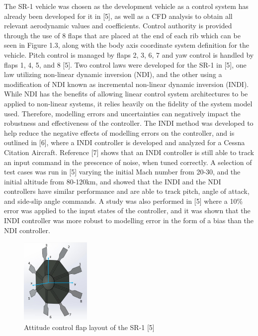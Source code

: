 \documentclass[12pt]{article}
\numberwithin{equation}{section}
\numberwithin{figure}{section}
\numberwithin{table}{section}
\begin{document}
The SR-1 vehicle was chosen as the development vehicle as a control system has already been developed for it in [5], as well as a CFD analysis to obtain all relevant aerodynamic values and coefficients. Control authority is provided through the use of 8 flaps that are placed at the end of each rib which can be seen in Figure 1.3, along with the body axis coordinate system definition for the vehicle. Pitch control is managed by flaps 2, 3, 6, 7 and yaw control is handled by flaps 1, 4, 5, and 8 [5]. Two control laws were developed for the SR-1 in [5], one law utilizing non-linear dynamic inversion (NDI), and the other using a modification of NDI known as incremental non-linear dynamic inversion (INDI). While NDI has the benefits of allowing linear control system architectures to be applied to non-linear systems, it relies heavily on the fidelity of the system model used. Therefore, modelling errors and uncertainties can negatively impact the robustness and effectiveness of the controller. The INDI method was developed to help reduce the negative effects of modelling errors on the controller, and is outlined in [6], where a INDI controller is developed and analyzed for a Cessna Citation Aircraft. Reference [7] shows that an INDI controller is still able to track an input command in the prescence of noise, when tuned correctly. A selection of test cases was run in [5] varying the initial Mach number from 20-30, and the initial altitude from 80-120km, and showed that the INDI and the NDI controllers have similar performance and are able to track pitch, angle of attack, and side-slip angle commands. A study was also performed in [5] where a 10\% error was applied to the input states of the controller, and it was shown that the INDI controller was more robust to modelling error in the form of a bias than the NDI controller.

\begin{figure}[h]
  \centering
  \includegraphics[width=0.3\textwidth]{Figures/SR-1 Controls and Coordinate.png}
  \caption{Attitude control flap layout of the SR-1 [5]}
  \label{fig:SR1_Controls}
\end{figure}
\end{document}
